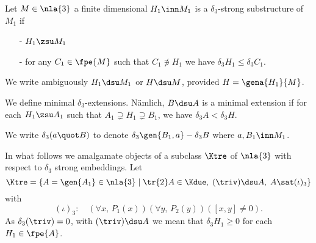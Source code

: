 
\begin{dfn}
Let $M\in\nla{3}$ a finite dimensional $H_{1}\inn M_{1}$ is a $\delta_{3}$-strong substructure of $M_{1}$
if
\begin{itemize}
\item[-]$H_{1}\zsu M_{1}$
\item[-]for any $C_{1}\in\fpe{M}$ such that $C_{1}\nni H_{1}$ we have $\delta_{3}H_{1}\leq\delta_{3}C_{1}$.
\end{itemize}
We write ambiguously $H_{1}\dsu M_{1}$ or $H\dsu M$, provided $H=\gena{H_{1}}{M}$.
\end{dfn}

We define minimal $\delta_{3}$-extensions.
N\"{a}mlich, $B\dsu A$ is a minimal extension if for each $H_{1}\zsu A_{1}$ such that
$A_{1}\supsetneq H_{1}\supsetneq B_{1}$, we have $\delta_{3}A<\delta_{3}H$.

We write $\delta_{3}(a\quot B)$ to denote $\delta_{3}\gen{B_{1},a}-\delta_{3}B$ where $a,B_{1}\inn M_{1}$.

\medskip
In what follows we amalgamate objects of a subclass $\Ktre$ of $\nla{3}$ with respect to $\delta_{3}$
strong embeddings.
Let $$\Ktre=\left\{A=\gen{A_{1}}\in\nla{3}\mid\tr{2}A\in\Kdue,\;(\triv)\dsu A,\;A\sat(\iota)_{3}\right\}$$
with
$$(\iota)_{3}\colon\quad(\forall x,\,P_{1}(x))(\forall y,\,P_{2}(y))([x,y]\neq 0).$$
As $\delta_{3}(\triv)=0$, with $(\triv)\dsu A$ we mean that $\delta_{3}H_{1}\geq0$ for each $H_{1}\in\fpe{A}$.

